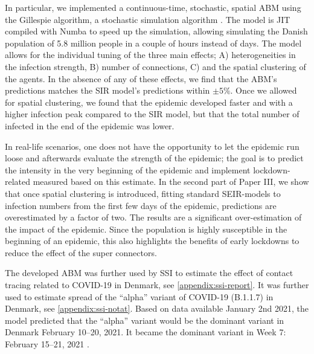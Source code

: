 In particular, we implemented a continuous-time, stochastic, spatial ABM using the Gillespie algorithm, a stochastic simulation algorithm \autocite{gillespieExactStochasticSimulation1977}. The model is JIT compiled with Numba \autocite{lamNumbaLLVMbasedPython2015} to speed up the simulation, allowing simulating the Danish population of 5.8 million people in a couple of hours instead of days. The model allows for the individual tuning of the three main effects; A) heterogeneities in the infection strength, B) number of connections, C) and the spatial clustering of the agents. In the absence of any of these effects, we find that the ABM's predictions matches the SIR model's predictions within $\pm 5 \%$. Once we allowed for spatial clustering, we found that the epidemic developed faster and with a higher infection peak compared to the SIR model, but that the total number of infected in the end of the epidemic was lower.

In real-life scenarios, one does not have the opportunity to let the epidemic run loose and afterwards evaluate the strength of the epidemic; the goal is to predict the intensity in the very beginning of the epidemic and implement lockdown-related measured based on this estimate. In the second part of Paper III, we show that once spatial clustering is introduced, fitting standard SEIR-models to infection numbers from the first few days of the epidemic, predictions are overestimated by a factor of two. The results are a significant over-estimation of the impact of the epidemic. Since the population is highly susceptible in the beginning of an epidemic, this also highlights the benefits of early lockdowns to reduce the effect of the super connectors.

The developed ABM was further used by SSI to estimate the effect of contact tracing related to COVID-19 in Denmark, see \autoref{appendix:ssi-report}. It was further used to estimate spread of the ``alpha'' variant of COVID-19 (B.1.1.7) in Denmark, see \autoref{appendix:ssi-notat}. Based on data available January 2nd 2021, the model predicted that the ``alpha'' variant would be the dominant variant in Denmark February 10--20, 2021. It became the dominant variant in Week 7: February 15--21, 2021 \autocite{bagerRiskHospitalisationAssociated2021}.
